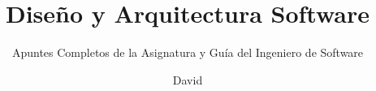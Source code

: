 \documentclass[blue]{apuntes}
\title{Diseño y Arquitectura Software}
\subtitle{Apuntes Completos de la Asignatura y Guía del Ingeniero de Software}
\author{David}
\begin{document}
\makecover

\tableofcontents
\newpage





\end{document}
